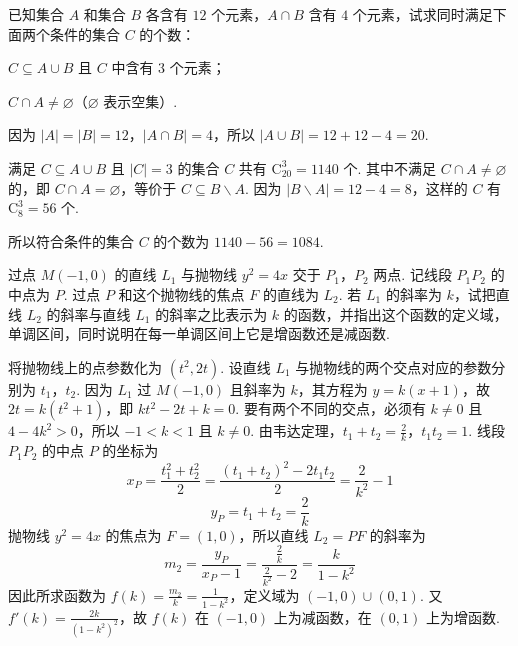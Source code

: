 \begin{problem}

已知集合 \(A\) 和集合 \(B\) 各含有 \(12\) 个元素，\(A \cap B\) 含有 \(4\) 个元素，试求同时满足下面两个条件的集合 \(C\) 的个数：

\begin{circlelist}
\item \(C \subseteq A \cup B\) 且 \(C\) 中含有 \(3\) 个元素；
\item \(C \cap A \neq \varnothing\)（\(\varnothing\) 表示空集）.
\end{circlelist}
\end{problem}

\begin{solution}
因为 \(\lvert A\rvert=\lvert B\rvert=12\)，\(\lvert A\cap B\rvert=4\)，所以 \(\lvert A\cup B\rvert=12+12-4=20\).

满足 \(C\subseteq A\cup B\) 且 \(\lvert C\rvert=3\) 的集合 \(C\) 共有 \(\mathrm C_{20}^{3}=1140\) 个. 其中不满足 \(C\cap A\neq\varnothing\) 的，即 \(C\cap A=\varnothing\)，等价于 \(C\subseteq B\smallsetminus A\). 因为 \(\lvert B\smallsetminus A\rvert=12-4=8\)，这样的 \(C\) 有 \(\mathrm C_{8}^{3}=56\) 个.

所以符合条件的集合 \(C\) 的个数为 \(1140-56=1084\).
\end{solution}

\begin{problem}

过点 \(M(-1,0)\) 的直线 \(L_1\) 与抛物线 \(y^2 = 4x\) 交于 \(P_1\)，\(P_2\) 两点. 记线段 \(P_1P_2\) 的中点为 \(P\). 过点 \(P\) 和这个抛物线的焦点 \(F\) 的直线为 \(L_2\). 若 \(L_1\) 的斜率为 \(k\)，试把直线 \(L_2\) 的斜率与直线 \(L_1\) 的斜率之比表示为 \(k\) 的函数，并指出这个函数的定义域，单调区间，同时说明在每一单调区间上它是增函数还是减函数.
\end{problem}

\begin{solution}
将抛物线上的点参数化为 \((t^2,2t)\). 设直线 \(L_1\) 与抛物线的两个交点对应的参数分别为 \(t_1\)，\(t_2\). 因为 \(L_1\) 过 \(M(-1,0)\) 且斜率为 \(k\)，其方程为 \(y=k(x+1)\)，故
\(2t=k(t^2+1)\)，即 \(kt^2-2t+k=0\).
要有两个不同的交点，必须有 \(k\neq0\) 且 \(4-4k^2>0\)，所以 \(-1<k<1\) 且 \(k\neq0\). 由韦达定理，\(t_1+t_2=\frac{2}{k}\)，\(t_1t_2=1\). 线段 \(P_1P_2\) 的中点 \(P\) 的坐标为
\[
x_P=\frac{t_1^2+t_2^2}{2}=\frac{(t_1+t_2)^2-2t_1t_2}{2}=\frac{2}{k^2}-1
\]
\[
y_P=t_1+t_2=\frac{2}{k}
\]
抛物线 \(y^2=4x\) 的焦点为 \(F=(1,0)\)，所以直线 \(L_2=PF\) 的斜率为
\[
m_2=\frac{y_P}{x_P-1}=\frac{\frac{2}{k}}{\frac{2}{k^2}-2}=\frac{k}{1-k^2}
\]
因此所求函数为 \(f(k)=\frac{m_2}{k}=\frac{1}{1-k^2}\)，定义域为 \((-1,0)\cup(0,1)\). 又
\(f'(k)=\frac{2k}{(1-k^2)^2}\)，故 \(f(k)\) 在 \((-1,0)\) 上为减函数，在 \((0,1)\) 上为增函数.
\end{solution}

